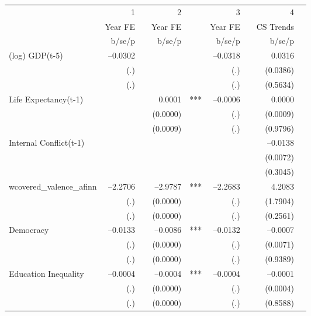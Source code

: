 \begin{tabular} {l* {4}{r @{} l}}
\hline
            &           1&   &           2&   &           3&   &           4&   \\
            &     Year FE&   &     Year FE&   &     Year FE&   &   CS Trends&   \\
            &      b/se/p&   &      b/se/p&   &      b/se/p&   &      b/se/p&   \\
\hline
(log) GDP(t-5)&    --0.0302&   &            &   &    --0.0318&   &      0.0316&   \\
            &         (.)&   &            &   &         (.)&   &    (0.0386)&   \\
            &         (.)&   &            &   &         (.)&   &    (0.5634)&   \\
Life Expectancy(t-1) &            &   &      0.0001&***&    --0.0006&   &      0.0000&   \\
            &            &   &    (0.0000)&   &         (.)&   &    (0.0009)&   \\
            &            &   &    (0.0009)&   &         (.)&   &    (0.9796)&   \\
Internal Conflict(t-1)&            &   &            &   &            &   &    --0.0138&   \\
            &            &   &            &   &            &   &    (0.0072)&   \\
            &            &   &            &   &            &   &    (0.3045)&   \\
wcovered\_valence\_afinn&    --2.2706&   &    --2.9787&***&    --2.2683&   &      4.2083&   \\
            &         (.)&   &    (0.0000)&   &         (.)&   &    (1.7904)&   \\
            &         (.)&   &    (0.0000)&   &         (.)&   &    (0.2561)&   \\
Democracy   &    --0.0133&   &    --0.0086&***&    --0.0132&   &    --0.0007&   \\
            &         (.)&   &    (0.0000)&   &         (.)&   &    (0.0071)&   \\
            &         (.)&   &    (0.0000)&   &         (.)&   &    (0.9389)&   \\
Education Inequality&    --0.0004&   &    --0.0004&***&    --0.0004&   &    --0.0001&   \\
            &         (.)&   &    (0.0000)&   &         (.)&   &    (0.0004)&   \\
            &         (.)&   &    (0.0000)&   &         (.)&   &    (0.8588)&   \\

\end{tabular}

